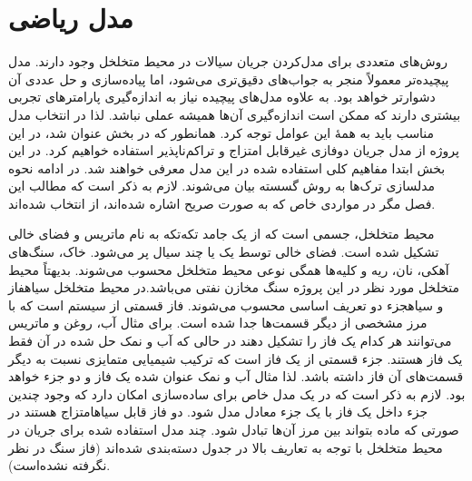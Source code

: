 \chapter{مدل ریاضی}
\label{ch:fasl2}

روش‌های متعددی برای مدل‌کردن جریان سیالات در محیط متخلخل وجود دارند. مدل پیچیده‌تر معمولاً منجر به جواب‌های دقیق‌تری می‌شود، اما پیاده‌سازی و حل عددی آن دشوارتر خواهد بود. به علاوه مدل‌های پیچیده نیاز به اندازه‌گیری پارامتر‌های تجربی بیشتری دارند که ممکن است اندازه‌گیری آن‌ها همیشه عملی نباشد. لذا در انتخاب مدل مناسب باید به همهٔ این عوامل توجه کرد. همانطور که در بخش  عنوان شد، در این پروژه از مدل جریان دوفازی غیرقابل امتزاج و تراکم‌ناپذیر استفاده خواهیم کرد. در این بخش ابتدا مفاهیم کلی استفاده شده در این مدل معرفی خواهند شد. در ادامه نحوه مدلسازی ترک‌ها به روش گسسته بیان می‌شوند. لازم به ذکر است که مطالب این فصل مگر در مواردی خاص که به صورت صریح اشاره شده‌اند، از  انتخاب شده‌اند.


محیط متخلخل، جسمی است که از یک جامد تکه‌تکه به نام ماتریس و فضای خالی تشکیل شده است. فضای خالی توسط یک یا چند سیال پر می‌شود. خاک، سنگ‌های آهکی، نان، ریه و کلیه‌ها همگی نوعی محیط متخلخل محسوب می‌شوند. بدیهتاً محیط متخلخل مورد نظر در این پروژه سنگ مخازن نفتی می‌باشد.در محیط متخلخل ‌سیاه{فاز} و ‌سیاه{جزء} دو تعریف اساسی محسوب می‌شوند. فاز قسمتی از سیستم است که با مرز مشخصی از دیگر قسمت‌ها جدا شده است. برای مثال آب، روغن و ماتریس می‌توانند هر کدام یک فاز را تشکیل دهند در حالی که آب و نمک حل شده در آن فقط یک فاز هستند. جزء قسمتی از یک فاز است که ترکیب شیمیایی متمایزی نسبت به دیگر قسمت‌های آن فاز داشته باشد. لذا مثال آب و نمک عنوان شده یک فاز و دو جزء خواهد بود. لازم به ذکر است که در یک مدل خاص برای ساده‌سازی امکان دارد که وجود چندین جزء داخل یک فاز با یک جزء معادل مدل شود. دو فاز قابل ‌سیاه{امتزاج} هستند در صورتی که ماده بتواند بین مرز آن‌ها تبادل شود. چند مدل استفاده شده برای جریان در محیط متخلخل با توجه به تعاریف بالا در جدول  دسته‌بندی شده‌اند (فاز سنگ در نظر نگرفته نشده‌است).

